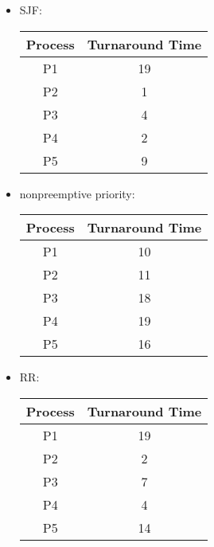 \begin{enumerate}
\begin{enumerate}
\begin{itemize}
            \item SJF:

            \begin{center}
            \begin{tabular}{|c|c|}
                \hline
                Process & Turnaround Time \\
                \hline
                P1 & 19 \\
                \hline
                P2 & 1 \\
                \hline
                P3 & 4 \\
                \hline
                P4 & 2 \\
                \hline
                P5 & 9 \\
                \hline
            \end{tabular}
            \end{center}
                        
            \item nonpreemptive priority:
            
            \begin{center}
            \begin{tabular}{|c|c|}
                \hline
                Process & Turnaround Time \\
                \hline
                P1 & 10 \\
                \hline
                P2 & 11 \\
                \hline
                P3 & 18 \\
                \hline
                P4 & 19 \\
                \hline
                P5 & 16 \\
                \hline
            \end{tabular}
            \end{center}
            
            \item RR:
            
            \begin{center}
            \begin{tabular}{|c|c|}
                \hline
                Process & Turnaround Time \\
                \hline
                P1 & 19 \\
                \hline
                P2 & 2 \\
                \hline
                P3 & 7 \\
                \hline
                P4 & 4 \\
                \hline
                P5 & 14 \\
                \hline
            \end{tabular}
            \end{center}


\end{itemize}
\end{enumerate}
\end{enumerate}
